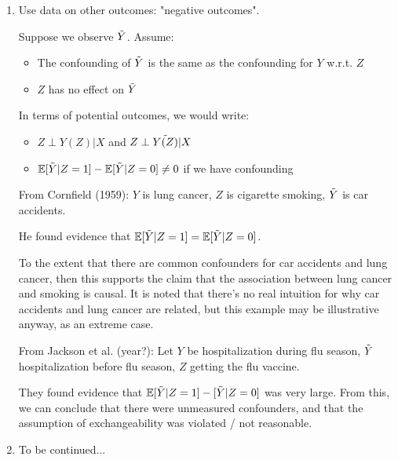 \begin{enumerate}
    \item Use data on other outcomes: "negative outcomes".
    
    Suppose we observe $\Tilde{Y}$. Assume:
    \begin{itemize}
        \item The confounding of $\Tilde{Y}$ is the same as the confounding for $Y$ w.r.t. $Z$
        \item $Z$ has no effect on $\Tilde{Y}$
    \end{itemize}
    \begin{center}
    \end{center}
    In terms of potential outcomes, we would write:
    \begin{itemize}
        \item $Z \perp Y(Z) | X$ and $Z \perp \Tilde{Y(Z)} | X$
        \item $\mathbb{E}[\Tilde{Y}|Z=1]-\mathbb{E}[\Tilde{Y}|Z=0] \neq 0$ if we have confounding 
    \end{itemize}
    \begin{example}
        From Cornfield (1959): $Y$ is lung cancer, $Z$ is cigarette smoking, $\Tilde{Y}$ is car accidents. 

        He found evidence that $\mathbb{E}[\Tilde{Y}|Z=1] = \mathbb{E}[\Tilde{Y}|Z=0]$.

        To the extent that there are common confounders for car accidents and lung cancer, then this supports the claim that the association between lung cancer and smoking is causal. It is noted that there's no real intuition for why car accidents and lung cancer are related, but this example may be illustrative anyway, as an extreme case.
    \end{example}
    \begin{example}
        From Jackson et al. (year?): Let $Y$ be hospitalization during flu season, $\Tilde{Y}$ hospitalization before flu season, $Z$ getting the flu vaccine.

        They found evidence that $\mathbb{E}[\Tilde{Y}|Z=1] - [\Tilde{Y}|Z=0]$ was very large. From this, we can conclude that there were unmeasured confounders, and that the assumption of exchangeability was violated / not reasonable.
    \end{example}
    \item To be continued...
\end{enumerate}





